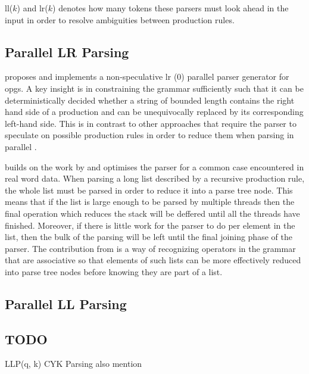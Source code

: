 \gls{ll}($k$) and \gls{lr}($k$) denotes how many tokens these parsers must look
ahead in the input in order to resolve ambiguities between production rules.

\subsection{Parallel LR Parsing} \label{parallel_lr_parsing}

\cite{barenghi_parallel_2015} proposes and implements a non-speculative \gls{lr}
(0) parallel parser generator for \gls{opg}s. A key insight is in constraining
the grammar sufficiently such that it can be deterministically decided whether
a string of bounded length contains the right hand side of a production
and can be unequivocally replaced by its corresponding left-hand side. This
is in contrast to other approaches that require the parser to speculate on
possible production rules in order to reduce them when parsing in parallel
\citep{mickunas_parallel_1978}.

\cite{li_associative_2023} builds on the work by \cite{barenghi_parallel_2015}
and optimises the parser for a common case encountered in real word data. When
parsing a long list described by a recursive production rule, the whole list
must be parsed in order to reduce it into a parse tree node. This means that
if the list is large enough to be parsed by multiple threads then the final
operation which reduces the stack will be deffered until all the threads have
finished. Moreover, if there is little work for the parser to do per element
in the list, then the bulk of the parsing will be left until the final joining
phase of the parser. The contribution from \cite{li_associative_2023} is a way
of recognizing operators in the grammar that are associative so that elements of
such lists can be more effectively reduced into parse tree nodes before knowing
they are part of a list.

\subsection{Parallel LL Parsing} \label{parallel_ll_parsing}



\subsection{TODO}
\begin{roughwork}
    LLP(q, k) \cite{robin_voetter_parallel_2021}
    \newline \newline
    CYK Parsing \cite{skrzypczak_parallel_nodate}
    \newline \newline
    also mention \cite{mark_thierry_vandevoorde_parallel_1988, alblas_bibliography_1994}
\end{roughwork}

